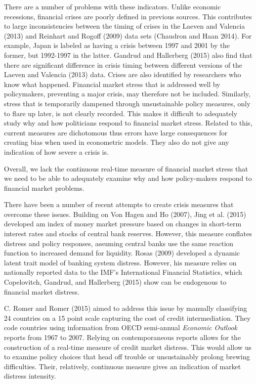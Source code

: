\documentclass[]{article}
\begin{document}
There are a number of problems with these indicators. Unlike economic
recessions, financial crises are poorly defined in previous sources.
This contributes to large inconsistencies between the timing of crises
in the Laeven and Valencia (2013) and Reinhart and Rogoff (2009) data
sets (Chaudron and Haan 2014). For example, Japan is labeled as having a
crisis between 1997 and 2001 by the former, but 1992-1997 in the latter.
Gandrud and Hallerberg (2015) also find that there are significant
difference in crisis timing between different versions of the Laeven and
Valencia (2013) data. Crises are also identified by researchers who know
what happened. Financial market stress that is addressed well by
policymakers, preventing a major crisis, may therefore not be included.
Similarly, stress that is temporarily dampened through unsustainable
policy measures, only to flare up later, is not clearly recorded. This
makes it difficult to adequately study why and how politicians respond
to financial market stress. Related to this, current measures are
dichotomous thus errors have large consequences for creating bias when
used in econometric models. They also do not give any indication of how
severe a crisis is.

Overall, we lack the continuous real-time measure of financial market
stress that we need to be able to adequately examine why and how
policy-makers respond to financial market problems.

There have been a number of recent attempts to create crisis measures
that overcome these issues. Building on {Von Hagen} and Ho (2007), Jing
et al. (2015) developed am index of money market pressure based on
changes in short-term interest rates and stocks of central bank
reserves. However, this measure conflates distress and policy responses,
assuming central banks use the same reaction function to increased
demand for liquidity. Rosas (2009) developed a dynamic latent trait
model of banking system distress. However, his measure relies on
nationally reported data to the IMF's International Financial
Statistics, which Copelovitch, Gandrud, and Hallerberg (2015) show can
be endogenous to financial market distress.

C. Romer and Romer (2015) aimed to address this issue by manually
classifying 24 countries on a 15 point scale capturing the cost of
credit intermediation. They code countries using information from OECD
semi-annual \emph{Economic Outlook} reports from 1967 to 2007. Relying
on contemporaneous reports allows for the construction of a real-time
measure of credit market distress. This would allow us to examine policy
choices that head off trouble or unsustainably prolong brewing
difficulties. Their, relatively, continuous measure gives an indication
of market distress intensity.
\end{document}
